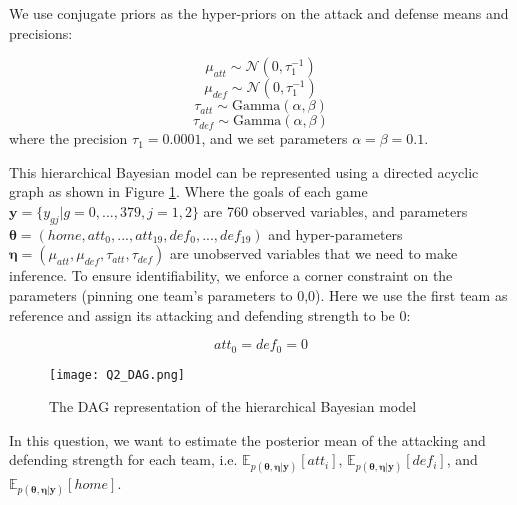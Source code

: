 \documentclass{article}
\newcommand{\yv}{\mathbf{y}}
\newcommand{\etav       }{\boldsymbol \eta       }
\newcommand{\thetav     }{\boldsymbol \theta     }
\begin{document}
We use conjugate priors as the hyper-priors on the attack and defense means and precisions:

$$\mu_{att} \sim \mathcal{N}(0, \tau_1^{-1})$$
$$\mu_{def} \sim \mathcal{N}(0, \tau_1^{-1})$$
$$\tau_{att} \sim \text{Gamma}(\alpha, \beta)$$
$$\tau_{def} \sim \text{Gamma}(\alpha, \beta)$$
where the precision $\tau_1 = 0.0001$, and we set parameters $\alpha = \beta = 0.1$.

This hierarchical Bayesian model can be represented using a directed acyclic graph as shown in Figure \ref{fig:DAG}. Where the goals of each game $\yv = \{y_{gj} | g = 0,...,379, j = 1,2\}$ are 760 observed variables, and parameters $\mathbf{\thetav} = (home, att_0, ..., att_{19}, def_0, ..., def_{19})$ and hyper-parameters $\mathbf{\etav} = (\mu_{att}, \mu_{def}, \tau_{att}, \tau_{def})$ are unobserved variables that we need to make inference. To ensure identifiability, we enforce a corner constraint on the parameters (pinning one team's parameters to 0,0). Here we use the first team as reference and assign its attacking and defending strength to be 0:

$$att_{0} = def_{0} = 0$$

\begin{figure}[h]
	\centering
	\texttt{[image: Q2\_DAG.png]}
	\caption{The DAG representation of the hierarchical Bayesian model}
\label{fig:DAG}
\end{figure}

In this question, we want to estimate the posterior mean of the attacking and defending strength for each team, i.e. $\mathbb{E}_{p(\thetav, \etav | \yv)}[att_i]$, $\mathbb{E}_{p(\thetav, \etav | \yv)}[def_i]$, and $\mathbb{E}_{p(\thetav, \etav | \yv)}[home]$. 
\end{document}
